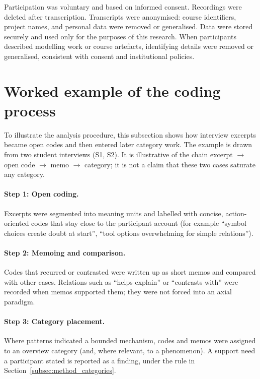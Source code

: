 Participation was voluntary and based on informed consent. Recordings were deleted after transcription. Transcripts were anonymised: course identifiers, project names, and personal data were removed or generalised. Data were stored securely and used only for the purposes of this research. When participants described modelling work or course artefacts, identifying details were removed or generalised, consistent with consent and institutional policies.

\section{Worked example of the coding process}
\label{sec:method_coding_example}

To illustrate the analysis procedure, this subsection shows how interview excerpts became open codes and then entered later category work. The example is drawn from two student interviews (S1, S2). It is illustrative of the chain excerpt $\rightarrow$ open code $\rightarrow$ memo $\rightarrow$ category; it is not a claim that these two cases saturate any category.

\paragraph{Step 1: Open coding.}
Excerpts were segmented into meaning units and labelled with concise, action-oriented codes that stay close to the participant account (for example ``symbol choices create doubt at start'', ``tool options overwhelming for simple relations'').

\paragraph{Step 2: Memoing and comparison.}
Codes that recurred or contrasted were written up as short memos and compared with other cases. Relations such as ``helps explain'' or ``contrasts with'' were recorded when memos supported them; they were not forced into an axial paradigm.

\paragraph{Step 3: Category placement.}
Where patterns indicated a bounded mechanism, codes and memos were assigned to an overview category (and, where relevant, to a phenomenon). A support need a participant stated is reported as a finding, under the rule in Section~\ref{subsec:method_categories}.

